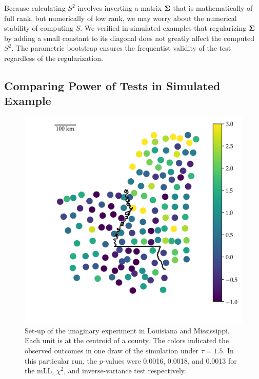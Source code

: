 	Because calculating \(S^2\) involves inverting a matrix \(\bm{\Sigma}\) that is mathematically of full rank, but numerically of low rank, we may worry about the numerical stability of computing \(S\).
We verified in simulated examples that regularizing \(\bm{\Sigma}\) by adding a small constant to its diagonal does not greatly affect the computed \(S^2\).
The parametric bootstrap ensures the frequentist validity of the test
regardless of the regularization.


\subsection{Comparing Power of Tests in Simulated Example}
\label{sec:powersim}

\begin{figure}[tb]
    \centering
    \includegraphics[height=0.4\textheight]{figures/mississippi_sim.png}
    \caption{
		\label{fig:mississippi_counties}
		Set-up of the imaginary experiment in Louisiana and Mississippi. Each unit is at the centroid of a county. The colors indicated the observed outcomes in one draw of the simulation under \(\tau=1.5\). In this particular run, the \(p\)-values were 0.0016, 0.0018, and 0.0013 for the mLL, \(\chi^2\), and inverse-variance test respectively.}
\end{figure}

